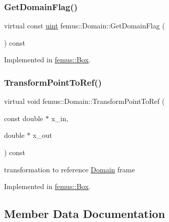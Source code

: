 \subsubsection{\texorpdfstring{Get\+Domain\+Flag()}{GetDomainFlag()}}
{\footnotesize\ttfamily virtual const \mbox{\hyperlink{_typedefs_8hpp_a91ad9478d81a7aaf2593e8d9c3d06a14}{uint}} femus\+::\+Domain\+::\+Get\+Domain\+Flag (\begin{DoxyParamCaption}{ }\end{DoxyParamCaption}) const\hspace{0.3cm}{\ttfamily [pure virtual]}}



Implemented in \mbox{\hyperlink{classfemus_1_1_box_ae1e35410fff5545cd0c203cd9ad3001d}{femus\+::\+Box}}.

\mbox{\label{classfemus_1_1_domain_afde27aa114c601801cc727ef9edf31de}} 
\subsubsection{\texorpdfstring{Transform\+Point\+To\+Ref()}{TransformPointToRef()}}
{\footnotesize\ttfamily virtual void femus\+::\+Domain\+::\+Transform\+Point\+To\+Ref (\begin{DoxyParamCaption}\item[{const double $\ast$}]{x\+\_\+in,  }\item[{double $\ast$}]{x\+\_\+out }\end{DoxyParamCaption}) const\hspace{0.3cm}{\ttfamily [pure virtual]}}



transformation to reference \mbox{\hyperlink{classfemus_1_1_domain}{Domain}} frame 



Implemented in \mbox{\hyperlink{classfemus_1_1_box_a64a23d5bb0cac88b4e545b121988b3cf}{femus\+::\+Box}}.



\subsection{Member Data Documentation}
\mbox{\label{classfemus_1_1_domain_a0cde7463658ab6de6a74ed6afedca6a0}} 
